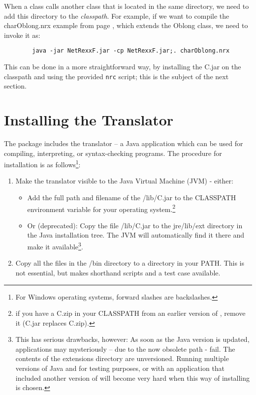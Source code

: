 When a class calls another class that is located in the same
directory, we need to add this directory to the \emph{classpath}. For
example, if we want to compile the charOblong.nrx example from page
\pageref{charoblong}, which extends the Oblong class, we need to
invoke it as:
 \begin{lstlisting}
        java -jar NetRexxF.jar -cp NetRexxF.jar;. charOblong.nrx
\end{lstlisting}
This can be done in a more straightforward way, by installing the
\nr{}C.jar on the classpath and using the provided \texttt{nrc}
script; this is the subject of the next section.

\section{Installing the \nr{} Translator}
The \nr{} package includes the \nr{} translator – a Java application which can be used for compiling, interpreting, or syntax-checking \nr{} programs. The procedure for installation is as follows\footnote{For Windows operating systems, forward slashes are backslashes.}:
\begin{enumerate}
\item Make the translator visible to the Java Virtual Machine (JVM) - either:
\begin{itemize} 
\item Add the full path and filename of the \nr{}/lib/\nr{}C.jar to the CLASSPATH environment variable for your operating system.\footnote{if you have a \nr{}C.zip in your CLASSPATH from an earlier version of \nr{}, remove it (\nr{}C.jar replaces \nr{}C.zip).}
\item Or (deprecated): Copy the file \nr{}/lib/\nr{}C.jar to the jre/lib/ext directory in the Java installation tree. The JVM will automatically find it there and make it available\footnote{ This has serious drawbacks, however:
As soon as the Java version is updated, \nr{} applications may
mysteriously – due to the now obsolete path - fail. The contents of
the extensions directory are unversioned.
Running multiple versions of Java and \nr{} for testing purposes, or
with an application that included another version of \nr{} will become very hard when this way of installing is chosen.}.
\end{itemize}
\item Copy all the files in the \nr{}/bin directory to a directory in your PATH. This is not essential, but makes shorthand scripts and a test case available. 
\end{enumerate}
